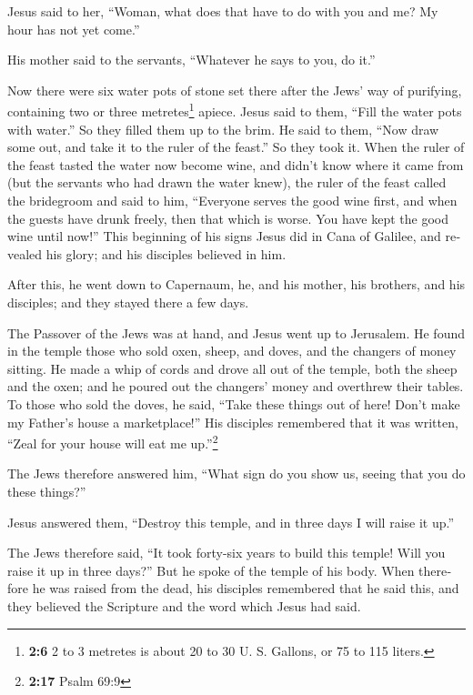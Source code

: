 \begin{paracol}{2}
\begin{otherlanguage}{english}
 Jesus said to her, ``Woman, what does that have to do
with you and me? My hour has not yet come.''

 His mother said to the servants, ``Whatever he says to
you, do it.''

 Now there were six water pots of stone set there after
the Jews' way of purifying, containing two or three metretes\footnote{\textbf{2:6}
  2 to 3 metretes is about 20 to 30 U. S. Gallons, or 75 to 115 liters.}
apiece.  Jesus said to them, ``Fill the water pots with
water.'' So they filled them up to the brim.  He said to
them, ``Now draw some out, and take it to the ruler of the feast.'' So
they took it.  When the ruler of the feast tasted the
water now become wine, and didn't know where it came from (but the
servants who had drawn the water knew), the ruler of the feast called
the bridegroom  and said to him, ``Everyone serves the
good wine first, and when the guests have drunk freely, then that which
is worse. You have kept the good wine until now!''  This
beginning of his signs Jesus did in Cana of Galilee, and revealed his
glory; and his disciples believed in him.

 After this, he went down to Capernaum, he, and his
mother, his brothers, and his disciples; and they stayed there a few
days.

 The Passover of the Jews was at hand, and Jesus went up
to Jerusalem.  He found in the temple those who sold
oxen, sheep, and doves, and the changers of money sitting.
 He made a whip of cords and drove all out of the temple,
both the sheep and the oxen; and he poured out the changers' money and
overthrew their tables.  To those who sold the doves, he
said, ``Take these things out of here! Don't make my Father's house a
marketplace!''  His disciples remembered that it was
written, ``Zeal for your house will eat me up.''\footnote{\textbf{2:17}
  Psalm 69:9}

 The Jews therefore answered him, ``What sign do you show
us, seeing that you do these things?''

 Jesus answered them, ``Destroy this temple, and in three
days I will raise it up.''

 The Jews therefore said, ``It took forty-six years to
build this temple! Will you raise it up in three days?'' 
But he spoke of the temple of his body.  When therefore
he was raised from the dead, his disciples remembered that he said this,
and they believed the Scripture and the word which Jesus had said.


\end{otherlanguage}
\end{paracol}
